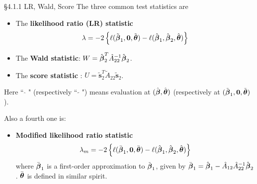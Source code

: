 \documentclass{beamer}
\begin{document}
\begin{frame}{\S4.1.1 LR, Wald, Score}
The three common test statistics are
\begin{itemize}
\item[(1)]
The \textbf{likelihood ratio (LR) statistic}
$$\lambda=-2\left\{\ell (\tilde{\mbox{\boldmath $\beta$}}_1, \textbf{0}, \tilde{\mbox{\boldmath $\theta$}}) -
\ell (\hat{\mbox{\boldmath $\beta$}}_1, \hat{\mbox{\boldmath $\beta$}}_2, \hat{\mbox{\boldmath $\theta$}})\right\}$$
\item[(2)]
The \textbf{Wald statistic}: $\displaystyle W=\hat{\mbox{\boldmath $\beta$}}_2^T\hat{A}_{22}^{-1}
\hat{\mbox{\boldmath $\beta$}}_2$.
\item[(3)]
The \textbf{score statistic} : $\displaystyle U=\tilde{\textbf{s}}_2^T\tilde{A}_{22}\tilde{\textbf{s}}_2$.
\end{itemize}
Here `` $\hat{}$ " (respectively `` $\tilde{}$ ") means evaluation at $(\hat{\mbox{\boldmath $\beta$}}, 
\hat{\mbox{\boldmath $\theta$}})$ (respectively at $(\tilde{\mbox{\boldmath $\beta$}}_1, \textbf{0},
\tilde{\mbox{\boldmath $\theta$}})$).

Also a fourth one is: 

\begin{itemize}
\item[(4)]
\textbf{Modified likelihood ratio statistic}
$$\lambda_m=-2\left\{\ell (\bar{\mbox{\boldmath $\beta$}}_1, \textbf{0}, \bar{\mbox{\boldmath $\theta$}}) -
\ell (\hat{\mbox{\boldmath $\beta$}}_1, \hat{\mbox{\boldmath $\beta$}}_2, \hat{\mbox{\boldmath $\theta$}})\right\}$$
where $\bar{\mbox{\boldmath $\beta$}}_1$ is a first-order approximation to $\tilde{\mbox{\boldmath $\beta$}}_1$,
given by $\bar{\mbox{\boldmath $\beta$}}_1=\hat{\mbox{\boldmath $\beta$}}_1-\hat{A}_{12}\hat{A}_{22}^{-1}
\hat{\mbox{\boldmath $\beta$}}_2$.  $\bar{\mbox{\boldmath $\theta$}}$ is defined in similar spirit.
\end{itemize}
\end{frame}
\end{document}
